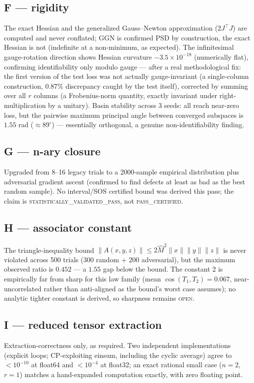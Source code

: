 \documentclass[11pt]{amsart}
\begin{document}
\subsection{F --- rigidity}
The exact Hessian and the generalized Gauss--Newton approximation ($2 J^\top J$)
are computed and never conflated; GGN is confirmed PSD by construction,
the exact Hessian is not (indefinite at a non-minimum, as expected). The
infinitesimal gauge-rotation direction shows Hessian curvature
$-3.5\times10^{-18}$ (numerically flat), confirming identifiability only
modulo gauge --- after a real methodological fix: the first version of
the test loss was not actually gauge-invariant (a single-column
construction, $0.87\%$ discrepancy caught by the test itself), corrected
by summing over all $r$ columns (a Frobenius-norm quantity, exactly
invariant under right-multiplication by a unitary). Basin stability across
3 seeds: all reach near-zero loss, but the pairwise maximum principal
angle between converged subspaces is $1.55$ rad ($\approx 89^\circ$) ---
essentially orthogonal, a genuine non-identifiability finding.

\subsection{G --- n-ary closure}
Upgraded from 8--16 legacy trials to a 2000-sample empirical distribution
plus adversarial gradient ascent (confirmed to find defects at least as
bad as the best random sample). No interval/SOS certified bound was
derived this pass; the claim is \textsc{statistically\_validated\_pass},
not \textsc{pass\_certified}.

\subsection{H --- associator constant}
The triangle-inequality bound $\|A(x,y,z)\| \le 2\hat M^2\|x\|\|y\|\|z\|$
is never violated across 500 trials (300 random + 200 adversarial), but
the maximum observed ratio is $0.452$ --- a $1.55$ gap below the bound.
The constant 2 is empirically far from sharp for this law family (mean
$\cos(T_1,T_2)=0.067$, near-uncorrelated rather than anti-aligned as the
bound's worst case assumes); no analytic tighter constant is derived, so
sharpness remains \textsc{open}.

\subsection{I --- reduced tensor extraction}
Extraction-correctness only, as required. Two independent
implementations (explicit loops; CP-exploiting einsum, including the
cyclic average) agree to $<10^{-10}$ at float64 and $<10^{-4}$ at
float32; an exact rational small case ($n=2$, $r=1$) matches a
hand-expanded computation exactly, with zero floating point.
\end{document}
